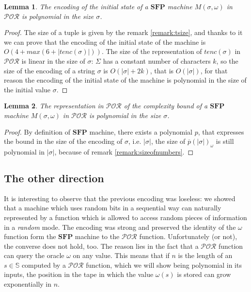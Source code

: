 \documentclass[10pt]{amsart}
\newcommand{\SFP}{\mathbf{SFP}}
\newcommand{\POR}{\mathcal{POR}}
\renewcommand{\SS}{\mathbb{S}}
\newcommand{\sone}{\sigma}
\newcommand{\oone}{\omega}
\newtheorem{lemma}{Lemma}
\begin{document}
\begin{lemma}
The encoding of the initial state of a $\SFP$ machine $M (\sone, \oone)$ in $\POR$ is polynomial in the size $\sone$.
\end{lemma}

\begin{proof}
The size of a tuple is given by the remark \ref{remark:tsize}, and thanks to it we can prove that the encoding of the initial state of the machine is $O(4+ max(6+|tenc(\sone)|))$. The size of the representation of $tenc(\sone)$ in $\POR$ is linear in the size of $\sone$: $\Sigma$ has a constant number of characters $k$, so the size of the encoding of a string $\sone$ is $O(|\sone|+ 2k)$, that is $O(|\sone|)$, for that reason the encoding of the initial state of the machine is polynomial in the size of the initial value $\sone$.
\end{proof}

\begin{lemma}
The representation in $\POR$ of the complexity bound of a $\SFP$ machine $M (\sone, \oone)$ in $\POR$ is polynomial in the size $\sone$.
\end{lemma}

\begin{proof}
By definition of $\SFP$ machine, there exists a polynomial $p$, that expresses the bound in the size of the encoding of $\sone$, i.e. $|\sone|$, the size of $\overline p(|\sone|)_\oone$ is still polynomial in $|\sone|$, because of remark \ref{remark:sizeofnumbers}.
\end{proof}


\subsection{The other direction}

It is interesting to observe that the previous encoding was loseless: we showed that a machine which uses random bits in a sequential way can naturally represented by a function which is allowed to access random pieces of information in a \emph{random} mode. The encoding was strong and preserved the identity of the $\omega$ function form the $\SFP$ machine to the $\POR$ function. Unfortunately (or not), the converse does not hold, too. The reason lies in the fact that a $\POR$ function can query the oracle $\omega$ on any value. This means that if $n$ is the length of an $s \in \SS$ computed by a $\POR$ function, which we will show being polynomial in its inputs, the position in the tape in which the value $\omega(s)$ is stored can grow exponentially in $n$.
\end{document}
